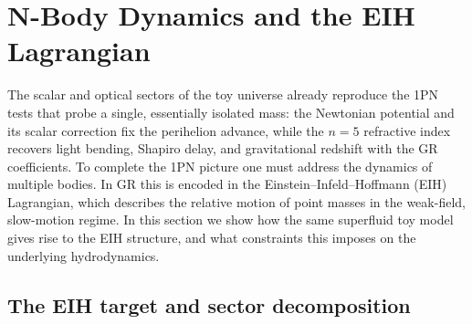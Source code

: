 \documentclass[11pt]{article}
\begin{document}
\section{N-Body Dynamics and the EIH Lagrangian}
\label{sec:nbody}

The scalar and optical sectors of the toy universe already reproduce
the 1PN tests that probe a single, essentially isolated mass: the
Newtonian potential and its scalar correction fix the perihelion
advance, while the $n=5$ refractive index recovers light bending,
Shapiro delay, and gravitational redshift with the GR coefficients.
To complete the 1PN picture one must address the dynamics of multiple
bodies.
In GR this is encoded in the Einstein--Infeld--Hoffmann (EIH)
Lagrangian, which describes the relative motion of point masses in
the weak-field, slow-motion regime.
In this section we show how the same superfluid toy model gives rise
to the EIH structure, and what constraints this imposes on the
underlying hydrodynamics.

\subsection{The EIH target and sector decomposition}
\label{subsec:nbody-target}
\end{document}
